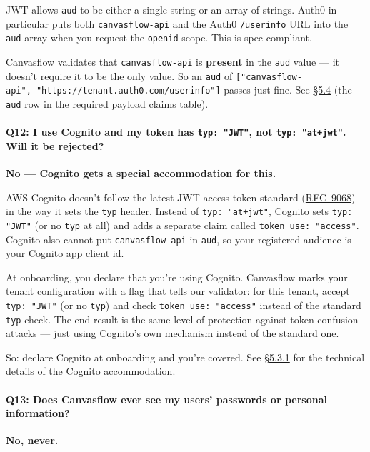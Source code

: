 JWT allows \texttt{aud} to be either a single string or an array of strings. Auth0 in
particular puts both \texttt{canvasflow-api} and the Auth0 \texttt{/userinfo} URL into
the \texttt{aud} array when you request the \texttt{openid} scope. This is
spec-compliant.

Canvasflow validates that \texttt{canvasflow-api} is \textbf{present} in the \texttt{aud}
value --- it doesn't require it to be the only value. So an \texttt{aud} of
{\scriptsize\texttt{["canvasflow-api",\ "https://tenant.auth0.com/userinfo"]}} passes just fine.
See \hyperref[sec:required-payload-claims]{\S5.4} (the \texttt{aud} row in the required payload claims table).

\paragraph{Q12: I use Cognito and my token has \texttt{typ: "JWT"}, not
\texttt{typ: "at+jwt"}. Will it be rejected?}

\textbf{No --- Cognito gets a special accommodation for this.}

AWS Cognito doesn't follow the latest JWT access token standard 
(\href{https://tools.ietf.org/html/rfc9068}{RFC~9068}) in the way it
sets the \texttt{typ} header. Instead of \texttt{typ: "at+jwt"}, Cognito sets
\texttt{typ: "JWT"} (or no \texttt{typ} at all) and adds a separate claim called
\texttt{token\_use: "access"}. Cognito also cannot put \texttt{canvasflow-api} in
\texttt{aud}, so your registered audience is your Cognito app client id.

At onboarding, you declare that you're using Cognito. Canvasflow marks your tenant
configuration with a flag that tells our validator: for this tenant, accept
\texttt{typ: "JWT"} (or no \texttt{typ}) and check \texttt{token\_use: "access"} instead of the standard
\texttt{typ} check. The end result is the same level of protection against token
confusion attacks --- just using Cognito's own mechanism instead of the standard one.

So: declare Cognito at onboarding and you're covered. See 
\hyperref[sec:token-type]{\S5.3.1} for the technical details of the Cognito 
accommodation.

\paragraph{Q13: Does Canvasflow ever see my users' passwords or personal information?}

\textbf{No, never.}

